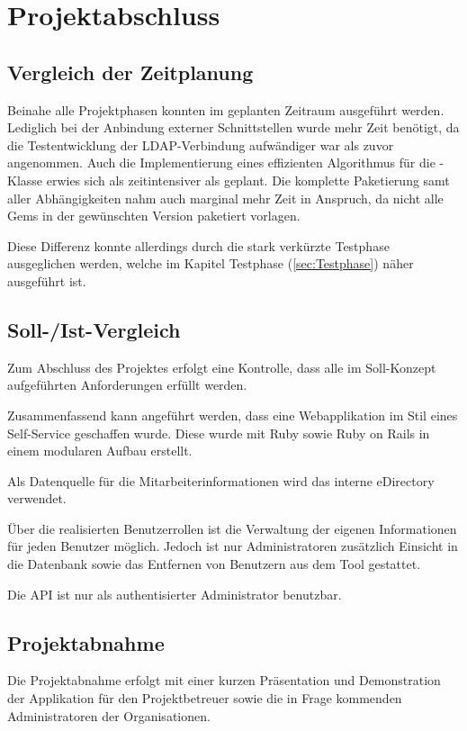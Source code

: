 \section{Projektabschluss}
\label{sec:Projektabschluss}

\subsection{Vergleich der Zeitplanung}
\label{sec:Vergleich der Zeitplanung}

Beinahe alle Projektphasen konnten im geplanten Zeitraum ausgeführt werden. Lediglich bei
der Anbindung externer Schnittstellen wurde mehr Zeit benötigt, da die Testentwicklung der
\acs{LDAP}-Verbindung aufwändiger war als zuvor angenommen. Auch die Implementierung eines
effizienten Algorithmus für die -Klasse erwies sich als zeitintensiver als geplant.
Die komplette Paketierung samt aller Abhängigkeiten nahm auch marginal mehr Zeit in Anspruch, da
nicht alle Gems in der gewünschten Version paketiert vorlagen.

Diese Differenz konnte allerdings durch die stark verkürzte Testphase ausgeglichen werden, welche im
Kapitel Testphase (\Vgl \ref{sec:Testphase}) näher ausgeführt ist.

\pagebreak

\subsection{Soll-/Ist-Vergleich}
\label{sec:SollIstVergleich}
Zum Abschluss des Projektes erfolgt eine Kontrolle, dass alle im Soll-Konzept aufgeführten
Anforderungen erfüllt werden.

Zusammenfassend kann angeführt werden, dass eine Webapplikation im Stil eines Self-Service
geschaffen wurde. Diese wurde mit Ruby sowie Ruby on Rails in einem modularen Aufbau erstellt.

Als Datenquelle für die Mitarbeiterinformationen wird das interne eDirectory verwendet.

Über die realisierten Benutzerrollen ist die Verwaltung der eigenen Informationen für jeden Benutzer
möglich. Jedoch ist nur Administratoren zusätzlich Einsicht in die Datenbank sowie das Entfernen von
Benutzern aus dem Tool gestattet.

Die API ist nur als authentisierter Administrator benutzbar.

\subsection{Projektabnahme}
\label{sec:Projektabnahme}
Die Projektabnahme erfolgt mit einer kurzen Präsentation und Demonstration der Applikation für den
Projektbetreuer sowie die in Frage kommenden Administratoren der Organisationen.

